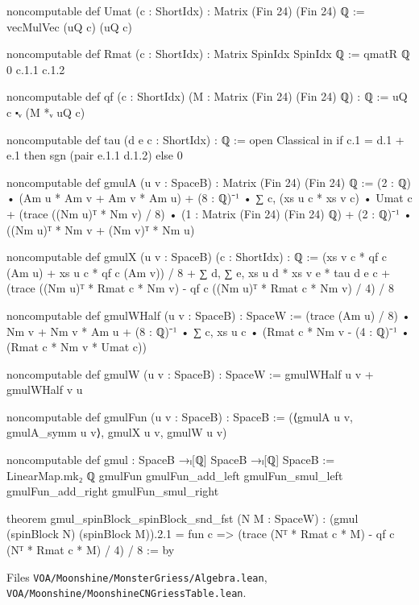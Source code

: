\documentclass[11pt,openany]{book}
\newcommand{\leanpath}[1]{\texttt{\small #1}}
\theoremstyle{definition}
\theoremstyle{plain}
\begin{document}
\begin{leancode}
noncomputable def Umat (c : ShortIdx) : Matrix (Fin 24) (Fin 24) ℚ := vecMulVec (uQ c) (uQ c)

noncomputable def Rmat (c : ShortIdx) : Matrix SpinIdx SpinIdx ℚ := qmatR ℚ 0 c.1.1 c.1.2

noncomputable def qf (c : ShortIdx) (M : Matrix (Fin 24) (Fin 24) ℚ) : ℚ :=
  uQ c ⬝ᵥ (M *ᵥ uQ c)

noncomputable def tau (d e c : ShortIdx) : ℚ :=
  open Classical in if c.1 = d.1 + e.1 then sgn (pair e.1.1 d.1.2) else 0
\end{leancode}
\begin{leancode}
noncomputable def gmulA (u v : SpaceB) : Matrix (Fin 24) (Fin 24) ℚ :=
  (2 : ℚ) • (Am u * Am v + Am v * Am u) + (8 : ℚ)⁻¹ • ∑ c, (xs u c * xs v c) • Umat c +
    (trace ((Nm u)ᵀ * Nm v) / 8) • (1 : Matrix (Fin 24) (Fin 24) ℚ) +
    (2 : ℚ)⁻¹ • ((Nm u)ᵀ * Nm v + (Nm v)ᵀ * Nm u)
\end{leancode}
\begin{leancode}
noncomputable def gmulX (u v : SpaceB) (c : ShortIdx) : ℚ :=
  (xs v c * qf c (Am u) + xs u c * qf c (Am v)) / 8 +
    ∑ d, ∑ e, xs u d * xs v e * tau d e c +
    (trace ((Nm u)ᵀ * Rmat c * Nm v) - qf c ((Nm u)ᵀ * Rmat c * Nm v) / 4) / 8

noncomputable def gmulWHalf (u v : SpaceB) : SpaceW :=
  (trace (Am u) / 8) • Nm v + Nm v * Am u +
    (8 : ℚ)⁻¹ • ∑ c, xs u c • (Rmat c * Nm v - (4 : ℚ)⁻¹ • (Rmat c * Nm v * Umat c))

noncomputable def gmulW (u v : SpaceB) : SpaceW := gmulWHalf u v + gmulWHalf v u

noncomputable def gmulFun (u v : SpaceB) : SpaceB :=
  (⟨gmulA u v, gmulA_symm u v⟩, gmulX u v, gmulW u v)
\end{leancode}
\begin{leancode}
noncomputable def gmul : SpaceB →ₗ[ℚ] SpaceB →ₗ[ℚ] SpaceB :=
  LinearMap.mk₂ ℚ gmulFun gmulFun_add_left gmulFun_smul_left gmulFun_add_right
    gmulFun_smul_right
\end{leancode}
\begin{leancode}
theorem gmul_spinBlock_spinBlock_snd_fst (N M : SpaceW) :
    (gmul (spinBlock N) (spinBlock M)).2.1
      = fun c => (trace (Nᵀ * Rmat c * M) - qf c (Nᵀ * Rmat c * M) / 4) / 8 := by
\end{leancode}
\noindent Files \leanpath{VOA/\allowbreak Moonshine/\allowbreak MonsterGriess/\allowbreak Algebra.lean}, \leanpath{VOA/\allowbreak Moonshine/\allowbreak MoonshineCNGriessTable.lean}.
\end{document}
